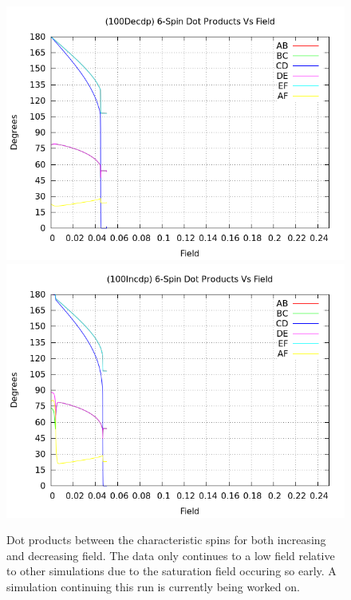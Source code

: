 \documentclass{article}
\begin{document}
\begin{figure}[ht]
\centering
\includegraphics[scale=0.5]{HVariedData/Pictures/100Decdp.png}
\includegraphics[scale=0.5]{HVariedData/Pictures/100Incdp.png}
\caption{Dot products between the characteristic spins for both increasing and decreasing field. The data only continues
to a low field relative to other simulations due to the saturation field occuring so early. A simulation continuing
this run is currently being worked on.}
\end{figure}
\clearpage
\end{document}
